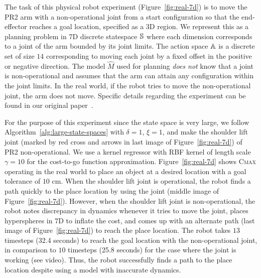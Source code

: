 The task of this physical robot experiment (Figure~\ref{fig:real-7d}) is
to move the PR2 arm with a
non-operational joint from a start configuration so that the
end-effector reaches a goal location, specified as a 3D
region. We represent this as a planning problem in 7D
discrete statespace $\mathbb{S}$ where each dimension corresponds to
a joint of the arm bounded by its joint limits. The action space
$\mathbb{A}$ is a discrete set of size 
$14$ corresponding to moving each joint by a fixed offset in the
positive or negative direction. The model $\hat{M}$ used for
planning \textit{does not} know that a joint is non-operational and
assumes that the arm can attain any configuration within the joint
limits. In the real world, if the robot tries to move the
non-operational joint, the arm does not move. Specific details regarding the experiment can
be found in our original paper~\cite{cmax}.

For the purpose of this
experiment since the state space is very large, we follow Algorithm~\ref{alg:large-state-spaces} with $\delta
= 1$, $\xi = 1$, and make the shoulder lift joint (marked by red cross and arrows
in last image of Figure~\ref{fig:real-7d}) of PR2 non-operational. We use a
kernel regressor with RBF kernel of length scale $\gamma = 10$ for
the cost-to-go function approximation. Figure~\ref{fig:real-7d} shows \textsc{Cmax} operating in the
real world to place an object at a desired location with a goal
tolerance of $10$ cm. When the shoulder lift joint is operational, the robot finds a
path quickly to the place location by using the joint (middle image of
Figure~\ref{fig:real-7d}). However, when the shoulder lift joint is
non-operational, the robot notes discrepancy in dynamics whenever it tries to
move the joint, places hyperspheres in 7D to inflate the cost, and
comes up with an alternate path (last image of
Figure~\ref{fig:real-7d}) to reach the place location. The 
robot takes $13$ timesteps (32.4 seconds) to reach the goal location with the
non-operational joint, in comparison to $10$ timesteps (25.8 seconds) for the case
where the joint is working (see video). Thus,
the robot successfully finds a path to the place location despite using a
model with inaccurate dynamics.

